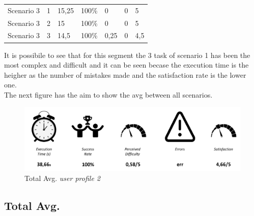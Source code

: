 {\begin{tabular}{lllllll}
	Scenario 3 & 1             & 15,25                 	& 100\%         	& 0					& 0					& 5                                                                                \\
	Scenario 3 & 2             & 15                 	& 100\%          	& 0					& 0					& 5                                                                                \\
	Scenario 3 & 3             & 14,5                	& 100\%          	& 0,25				& 0					& 4,5                                                                                 \\
\bottomrule
\end{tabular}

\vspace{1cm}
}It is possibile to see that for this segment the 3 task of scenario 1 has been the most complex and difficult and it can be seen becase the execution time is the heigher as the number of mistakes made and the satisfaction rate is the lower one. \\
The next figure has the aim to show the avg between all scenarios.

\begin{figure}[h!]
	\centering
	\begin{minipage}[b]{1\textwidth}
    		\includegraphics[width=\textwidth]{./assets/avg-2.png}
		\caption{Total Avg. \emph{user profile 2}}
	\end{minipage}
\end{figure}


\subsection{Total Avg.}
